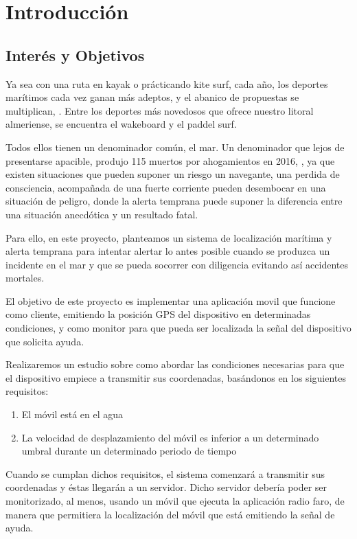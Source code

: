 \chapter{Introducción}
\label{intro}

\section{Interés y Objetivos}

Ya sea con una ruta en kayak o prácticando kite surf, cada año, los deportes
marítimos cada vez ganan más adeptos, y el abanico de propuestas se multiplican, \cite{RDACUA} . Entre los deportes más novedosos que ofrece nuestro litoral almeriense, se encuentra el wakeboard y el paddel surf. 

Todos ellos tienen un denominador común, el mar. Un denominador que lejos de presentarse apacible, produjo 115 muertos por ahogamientos en 2016, \cite{SalvamentoMaritimo}, ya que existen situaciones que pueden suponer un riesgo un navegante, una perdida de consciencia, acompañada de una fuerte corriente pueden desembocar en una situación de peligro, donde la alerta temprana puede suponer la diferencia entre una situación anecdótica y un resultado fatal.

Para ello, en este proyecto, planteamos un sistema de localización marítima y alerta temprana para intentar alertar lo antes posible cuando se produzca un incidente en el mar y que se pueda socorrer con diligencia evitando así accidentes mortales.


El objetivo de este proyecto es implementar una aplicación movil que funcione como cliente, emitiendo la posición GPS del dispositivo en determinadas condiciones, y como monitor para que pueda ser localizada la señal del dispositivo que solicita ayuda. \cite{VRUIZ}

Realizaremos un estudio sobre como abordar las condiciones necesarias para que el dispositivo empiece a transmitir sus coordenadas, basándonos en los siguientes requisitos:
\begin{enumerate}
\item El móvil está en el agua 
\item La velocidad de desplazamiento del móvil es inferior a un determinado umbral durante un determinado periodo de tiempo
\end{enumerate}

Cuando se cumplan dichos requisitos, el sistema comenzará a transmitir sus coordenadas y éstas llegarán a un servidor. Dicho servidor debería poder ser monitorizado, al menos, usando un móvil que ejecuta la aplicación radio faro, de manera que permitiera la localización del móvil que está emitiendo la señal de ayuda. 

